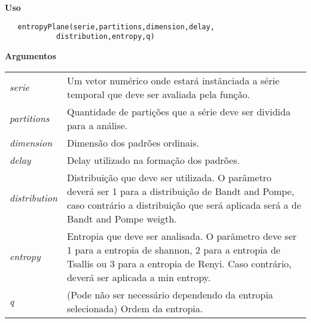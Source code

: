 \documentclass[12pt,letterpaper]{article}
\begin{document}
\vspace{-0.5cm}

\hrulefill  

\vspace{0.5cm}

\textbf{Uso}

\begin{lstlisting}
   entropyPlane(serie,partitions,dimension,delay,
   			distribution,entropy,q)
\end{lstlisting}

\vspace{0.5cm}

\textbf{Argumentos}

\begin{table}[!h]
\begin{center}
\begin{tabularx}{\textwidth}{X X}
\hspace{0.5cm} \textit{serie} \vspace{0.5cm}& Um vetor numérico onde estará instânciada a série temporal que deve ser avaliada pela função.\vspace{0.5cm}\\
\hspace{0.5cm} \textit{partitions} \vspace{0.5cm}& Quantidade de partições que a série deve ser dividida para a análise.\vspace{0.5cm}\\
\hspace{0.5cm} \textit{dimension} \vspace{0.5cm}& Dimensão dos padrões ordinais.\vspace{0.5cm}\\
\hspace{0.5cm} \textit{delay} \vspace{0.5cm}& Delay utilizado na formação dos padrões.\vspace{0.5cm}\\
\hspace{0.5cm} \textit{distribution} \vspace{0.5cm}& Distribuição que deve ser utilizada. O parâmetro deverá ser 1 para a distribuição de Bandt and Pompe, caso contrário a distribuição que será aplicada será a de Bandt and Pompe weigth.\vspace{0.5cm}\\
\hspace{0.5cm} \textit{entropy} \vspace{0.5cm}& Entropia que deve ser analisada. O parâmetro deve ser 1 para a entropia de shannon, 2 para a entropia de Tsallis ou 3 para a entropia de Renyi. Caso contrário, deverá ser aplicada a min entropy.\vspace{0.5cm}\\
\hspace{0.5cm} \textit{q} \vspace{0.5cm}& (Pode não ser necessário dependendo da entropia selecionada) Ordem da entropia.\vspace{0.5cm}\\
\end{tabularx}
\end{center}
\end{table} 
\newpage
\end{document}

